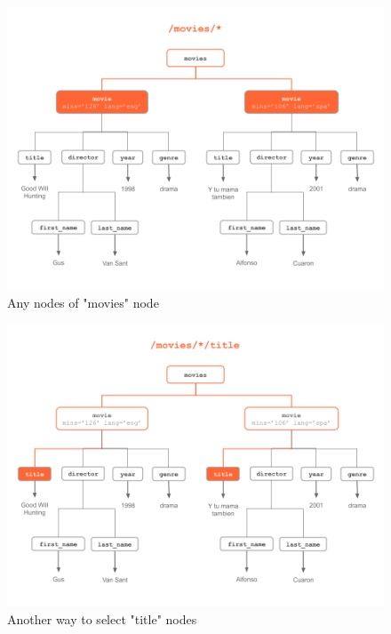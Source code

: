 \documentclass[
]{book}
\begin{document}
\begin{figure}

{\centering \includegraphics[width=0.85\linewidth]{images/xpath/xpath-example3} 

}

\caption{Any nodes of "movies" node}\label{fig:unnamed-chunk-53}
\end{figure}

\begin{figure}

{\centering \includegraphics[width=0.85\linewidth]{images/xpath/xpath-example4} 

}

\caption{Another way to select "title" nodes}\label{fig:unnamed-chunk-54}
\end{figure}
\end{document}
